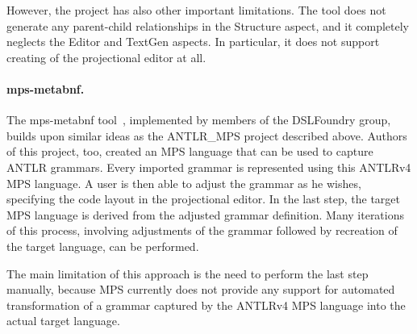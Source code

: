 However, the project has also other important limitations.
The tool does not generate any parent-child relationships in the Structure aspect, and it completely neglects the Editor and TextGen aspects.
In particular, it does not support creating of the projectional editor at all.


\paragraph{mps-metabnf.}
The mps-metabnf tool~\cite{ref:MPSMETABNF}, implemented by members of the DSLFoundry group, builds upon similar ideas as the ANTLR{\_}MPS project described above.
Authors of this project, too, created an MPS language that can be used to capture ANTLR grammars.
Every imported grammar is represented using this ANTLRv4 MPS language.
A user is then able to adjust the grammar as he wishes, specifying the code layout in the projectional editor.
In the last step, the target MPS language is derived from the adjusted grammar definition.
Many iterations of this process, involving adjustments of the grammar followed by recreation of the target language, can be performed.

The main limitation of this approach is the need to perform the last step manually, because MPS currently does not provide any support for automated transformation of a grammar captured by the ANTLRv4 MPS language into the actual target language.
